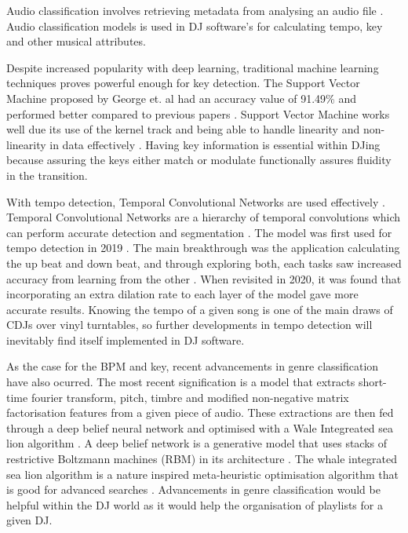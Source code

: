 Audio classification involves retrieving metadata from analysing an audio file \citep{sharma_audio_2021}. Audio classification models is used in DJ software's for calculating tempo, key and other musical attributes.

Despite increased popularity with deep learning, traditional machine learning techniques proves powerful enough for key detection. The Support Vector Machine proposed by George et. al had an accuracy value of 91.49\% and performed better compared to previous papers \citep{george_development_2022}. Support Vector Machine works well due its use of the kernel track and being able to handle linearity and non-linearity in data effectively \citep{hofmann_support_2006}. Having key information is essential within DJing because assuring the keys either match or modulate functionally assures fluidity in the transition. 

With tempo detection, Temporal Convolutional Networks are used effectively \citep{bock_deconstruct_2020}. Temporal Convolutional Networks are a hierarchy of temporal convolutions which can perform accurate detection and segmentation \citep{lea_temporal_2017}. The model was first used for tempo detection in 2019 \citep{bock_multi-task_2019}. The main breakthrough was the application  calculating the up beat and down beat, and through exploring both, each tasks saw increased accuracy from learning from the other \citep{bock_deconstruct_2020}. When revisited in 2020, it was found that incorporating an extra dilation rate to each layer of the model gave more accurate results. Knowing the tempo of a given song is one of the main draws of CDJs over vinyl turntables, so further developments in tempo detection will inevitably find itself implemented in DJ software.

As the case for the BPM and key, recent advancements in genre classification have also ocurred. The most recent signification is a model that extracts short-time fourier transform, pitch, timbre and modified non-negative matrix factorisation features from a given piece of audio. These extractions are then fed through a deep belief neural network and optimised with a Wale Integreated sea lion algorithm \citep{kumaraswamy_optimal_2022}. A deep belief network is a generative model that uses stacks of restrictive Boltzmann machines (RBM) in its architecture \citep{canuma_what_2022}. The whale integrated sea lion algorithm is a nature inspired meta-heuristic optimisation algorithm that is good for advanced searches \citep{mirjalili_whale_2016}. Advancements in genre classification would be helpful within the DJ world as it would help the organisation of playlists for a given DJ.

